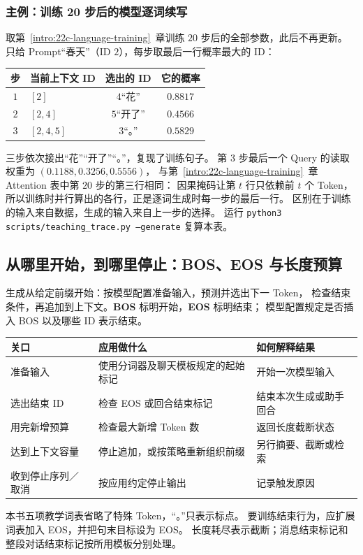 \subsubsection*{主例：训练 20 步后的模型逐词续写}
取第~\ref*{intro:22c-language-training}~章训练 $20$ 步后的全部参数，此后不再更新。
只给 Prompt“春天”（ID $2$），每步取最后一行概率最大的 ID：
\begin{center}\small
{}
\begin{tabular}{@{}clcc@{}}\toprule
步 & 当前上下文 ID & 选出的 ID & 它的概率\\\midrule
$1$ & $[2]$ & $4$“花” & $0.8817$\\
$2$ & $[2,4]$ & $5$“开了” & $0.4566$\\
$3$ & $[2,4,5]$ & $3$“。” & $0.5829$\\\bottomrule
\end{tabular}
\end{center}
三步依次接出“花”“开了”“。”，复现了训练句子。
第 $3$ 步最后一个 Query 的读取权重为 $(0.1188,0.3256,0.5556)$，
与第~\ref*{intro:22c-language-training}~章 Attention 表中第 $20$ 步的第三行相同：
因果掩码让第 $t$ 行只依赖前 $t$ 个 Token，
所以训练时并行算出的各行，正是逐词生成时每一步的最后一行。
区别在于训练的输入来自数据，生成的输入来自上一步的选择。
运行 \texttt{python3 scripts/teaching\_trace.py --generate} 复算本表。

\subsection{从哪里开始，到哪里停止：BOS、EOS 与长度预算}
\label{concept:bos-eos}
生成从给定前缀开始：按模型配置准备输入，预测并选出下一 Token，
检查结束条件，再追加到上下文。\textbf{BOS} 标明开始，\textbf{EOS} 标明结束；
模型配置规定是否插入 BOS 以及哪些 ID 表示结束。

\begin{center}\small
{}
\begin{tabularx}{\linewidth}{@{}p{32mm}XX@{}}
\toprule
关口 & 应用做什么 & 如何解释结果\\\midrule
准备输入 & 使用分词器及聊天模板规定的起始标记 & 开始一次模型输入\\
选出结束 ID & 检查 EOS 或回合结束标记 & 结束本次生成或助手回合\\
用完新增预算 & 检查最大新增 Token 数 & 返回长度截断状态\\
达到上下文容量 & 停止追加，或按策略重新组织前缀 & 另行摘要、截断或检索\\
收到停止序列／取消 & 按应用约定停止输出 & 记录触发原因\\
\bottomrule
\end{tabularx}
\end{center}
\begin{boundarybox}
本书五项教学词表省略了特殊 Token，“。”只表示标点。
要训练结束行为，应扩展词表加入 EOS，并把句末目标设为 EOS。
长度耗尽表示截断；消息结束标记和整段对话结束标记按所用模板分别处理。
\end{boundarybox}

